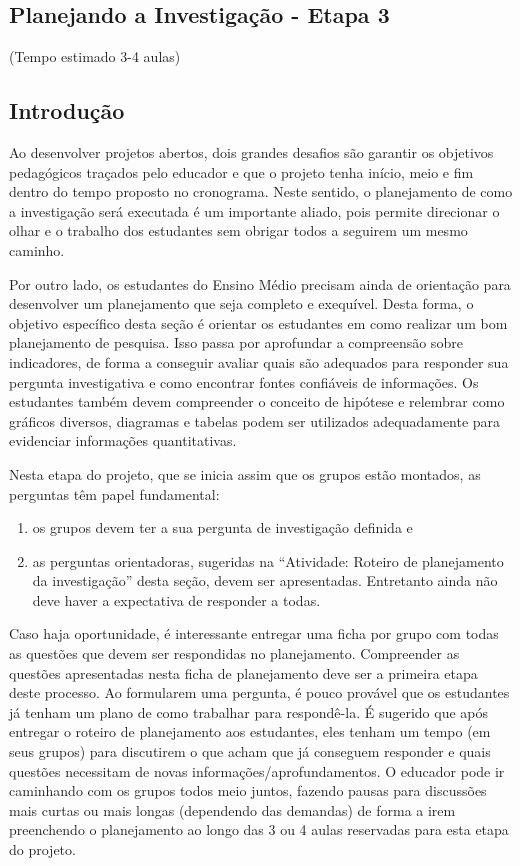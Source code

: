 \clearpage
\begin{paginatexto}

\section{Planejando a Investigação - Etapa 3}
(Tempo estimado 3-4 aulas)

\subsection{Introdução}
Ao desenvolver projetos abertos, dois grandes desafios são garantir os objetivos pedagógicos traçados pelo educador e que o projeto tenha início, meio e fim dentro do tempo proposto no cronograma. Neste sentido, o planejamento de como a investigação será executada é um importante aliado, pois permite direcionar o olhar e o trabalho dos estudantes sem obrigar todos a seguirem um mesmo caminho.

Por outro lado, os estudantes do Ensino Médio precisam ainda de orientação para desenvolver um planejamento que seja completo e exequível.
Desta forma, o objetivo específico desta seção é orientar os estudantes em como realizar um bom planejamento de pesquisa. Isso passa por aprofundar a compreensão sobre indicadores, de forma a conseguir avaliar quais são adequados para responder sua pergunta investigativa e como encontrar fontes confiáveis de informações. Os estudantes também devem compreender o conceito de hipótese e relembrar como gráficos diversos, diagramas e tabelas podem ser utilizados adequadamente para evidenciar informações quantitativas.

Nesta etapa do projeto, que se inicia assim que os grupos estão montados, as perguntas têm papel fundamental: 

\begin{enumerate}
\item os grupos devem ter a sua pergunta de investigação definida e 
 
\item as perguntas orientadoras, sugeridas na “Atividade: Roteiro de planejamento da investigação” desta seção, devem ser apresentadas. Entretanto ainda não deve haver a expectativa de responder a todas.
 \end{enumerate} 

Caso haja oportunidade, é interessante entregar uma ficha por grupo com todas as questões que devem ser respondidas no planejamento. Compreender as questões apresentadas nesta ficha de planejamento deve ser a primeira etapa deste processo. Ao formularem uma pergunta, é pouco provável que os estudantes já tenham um plano de como trabalhar para respondê-la. 
É sugerido que após entregar o roteiro de planejamento aos estudantes, eles tenham um tempo (em seus grupos) para discutirem o que acham que já conseguem responder e quais questões necessitam de novas informações/aprofundamentos. O educador pode ir caminhando com os grupos todos meio juntos, fazendo pausas para discussões mais curtas ou mais longas (dependendo das demandas) de forma a irem preenchendo o planejamento ao longo das 3 ou 4 aulas reservadas para esta etapa do projeto.


\end{paginatexto}

